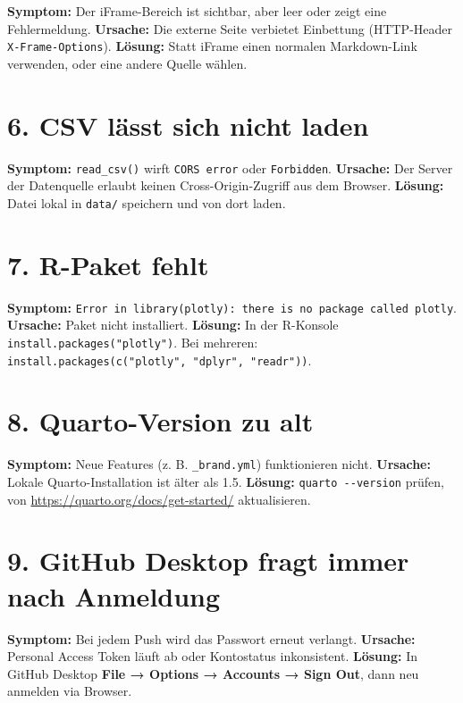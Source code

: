 \documentclass[
  ngerman,
  a4paper,
  DIV=11]{scrreprt}
\begin{document}
\textbf{Symptom:} Der iFrame-Bereich ist sichtbar, aber leer oder zeigt
eine Fehlermeldung. \textbf{Ursache:} Die externe Seite verbietet
Einbettung (HTTP-Header \texttt{X-Frame-Options}). \textbf{Lösung:}
Statt iFrame einen normalen Markdown-Link verwenden, oder eine andere
Quelle wählen.

\section{6. CSV lässt sich nicht
laden}\label{csv-luxe4sst-sich-nicht-laden}

\textbf{Symptom:} \texttt{read\_csv()} wirft \texttt{CORS\ error} oder
\texttt{Forbidden}. \textbf{Ursache:} Der Server der Datenquelle erlaubt
keinen Cross-Origin-Zugriff aus dem Browser. \textbf{Lösung:} Datei
lokal in \texttt{data/} speichern und von dort laden.

\section{7. R-Paket fehlt}\label{r-paket-fehlt}

\textbf{Symptom:}
\texttt{Error\ in\ library(plotly):\ there\ is\ no\ package\ called\ \textquotesingle{}plotly\textquotesingle{}}.
\textbf{Ursache:} Paket nicht installiert. \textbf{Lösung:} In der
R-Konsole \texttt{install.packages("plotly")}. Bei mehreren:
\texttt{install.packages(c("plotly",\ "dplyr",\ "readr"))}.

\section{8. Quarto-Version zu alt}\label{quarto-version-zu-alt}

\textbf{Symptom:} Neue Features (z. B. \texttt{\_brand.yml})
funktionieren nicht. \textbf{Ursache:} Lokale Quarto-Installation ist
älter als 1.5. \textbf{Lösung:} \texttt{quarto\ -\/-version} prüfen, von
\url{https://quarto.org/docs/get-started/} aktualisieren.

\section{9. GitHub Desktop fragt immer nach
Anmeldung}\label{github-desktop-fragt-immer-nach-anmeldung}

\textbf{Symptom:} Bei jedem Push wird das Passwort erneut verlangt.
\textbf{Ursache:} Personal Access Token läuft ab oder Kontostatus
inkonsistent. \textbf{Lösung:} In GitHub Desktop \textbf{File → Options
→ Accounts → Sign Out}, dann neu anmelden via Browser.
\end{document}
